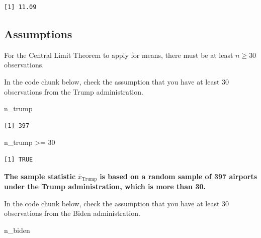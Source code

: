 \documentclass[
  letterpaper,
  DIV=11,
  numbers=noendperiod]{scrartcl}
\newenvironment{Shaded}{\begin{snugshade}}{\end{snugshade}}
\newcommand{\DecValTok}[1]{\textcolor[rgb]{0.68,0.00,0.00}{#1}}
\newcommand{\NormalTok}[1]{\textcolor[rgb]{0.00,0.23,0.31}{#1}}
\newcommand{\SpecialCharTok}[1]{\textcolor[rgb]{0.37,0.37,0.37}{#1}}
\begin{document}
\begin{verbatim}
[1] 11.09
\end{verbatim}

\subsection{Assumptions}\label{assumptions-1}

For the Central Limit Theorem to apply for means, there must be at least
\(n\ge30\) observations.

In the code chunk below, check the assumption that you have at least 30
observations from the Trump administration.

\begin{Shaded}
\begin{Highlighting}[]
\NormalTok{n\_trump}
\end{Highlighting}
\end{Shaded}

\begin{verbatim}
[1] 397
\end{verbatim}

\begin{Shaded}
\begin{Highlighting}[]
\NormalTok{n\_trump }\SpecialCharTok{\textgreater{}=} \DecValTok{30}
\end{Highlighting}
\end{Shaded}

\begin{verbatim}
[1] TRUE
\end{verbatim}

\begin{tcolorbox}[enhanced jigsaw, colback=white, breakable, arc=.35mm, left=2mm, colframe=quarto-callout-warning-color-frame, opacityback=0, rightrule=.15mm, toprule=.15mm, bottomrule=.15mm, leftrule=.75mm]

\textbf{The sample statistic} \(\bar{x}_{\text{Trump}}\) \textbf{is
based on a random sample of 397 airports under the Trump administration,
which is more than 30.}

\end{tcolorbox}

In the code chunk below, check the assumption that you have at least 30
observations from the Biden administration.

\begin{Shaded}
\begin{Highlighting}[]
\NormalTok{n\_biden}
\end{Highlighting}
\end{Shaded}
\end{document}
